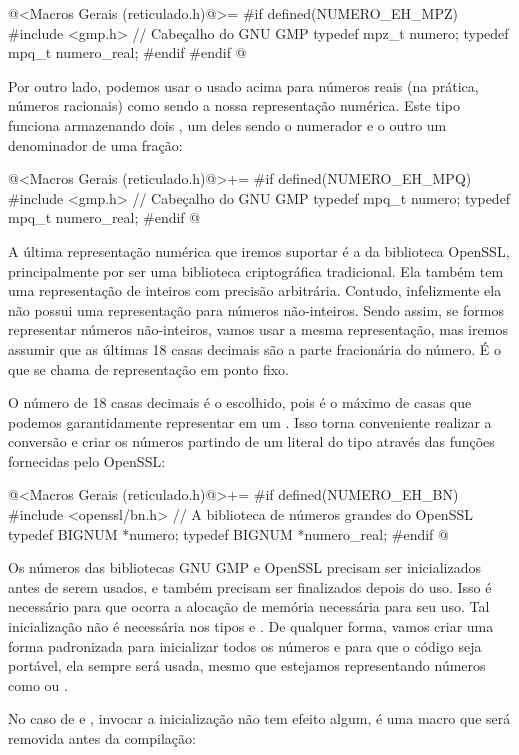 \iniciocodigo
@<Macros Gerais (reticulado.h)@>=
#if defined(NUMERO_EH_MPZ)
#include <gmp.h> // Cabeçalho do GNU GMP
typedef mpz_t numero;
typedef mpq_t numero_real;
#endif
#endif
@
\fimcodigo

Por outro lado, podemos usar o  usado acima para
números reais (na prática, números racionais) como sendo a nossa
representação numérica. Este tipo funciona armazenando
dois , um deles sendo o numerador e o outro um
denominador de uma fração: 


\iniciocodigo
@<Macros Gerais (reticulado.h)@>+=
#if defined(NUMERO_EH_MPQ)
#include <gmp.h> // Cabeçalho do GNU GMP
typedef mpq_t numero;
typedef mpq_t numero_real;
#endif
@
\fimcodigo

A última representação numérica que iremos suportar é a da biblioteca
OpenSSL, principalmente por ser uma biblioteca criptográfica
tradicional. Ela também tem uma representação de inteiros com precisão
arbitrária. Contudo, infelizmente ela não possui uma
representação para números não-inteiros. Sendo assim, se formos
representar números não-inteiros, vamos usar a mesma representação,
mas iremos assumir que as últimas 18 casas decimais são a parte
fracionária do número. É o que se chama de representação em ponto
fixo.

O número de 18 casas decimais é o escolhido, pois é o máximo de casas
que podemos garantidamente representar em um . Isso torna conveniente realizar a conversão e criar os números
partindo de um literal do tipo  através das
funções fornecidas pelo OpenSSL:

\iniciocodigo
@<Macros Gerais (reticulado.h)@>+=
#if defined(NUMERO_EH_BN)
#include <openssl/bn.h> // A biblioteca de números grandes do OpenSSL
typedef BIGNUM *numero;
typedef BIGNUM *numero_real;
#endif
@
\fimcodigo

Os números das bibliotecas GNU GMP e OpenSSL precisam ser
inicializados antes de serem usados, e também precisam ser finalizados
depois do uso. Isso é necessário para que ocorra a alocação de memória
necessária para seu uso. Tal inicialização não é necessária nos
tipos  e . De qualquer forma, vamos
criar uma forma padronizada para inicializar todos os números e para
que o código seja portável, ela sempre será usada, mesmo que estejamos
representando números como  ou .

No caso de  e , invocar a
inicialização não tem efeito algum, é uma macro que será removida
antes da compilação:

